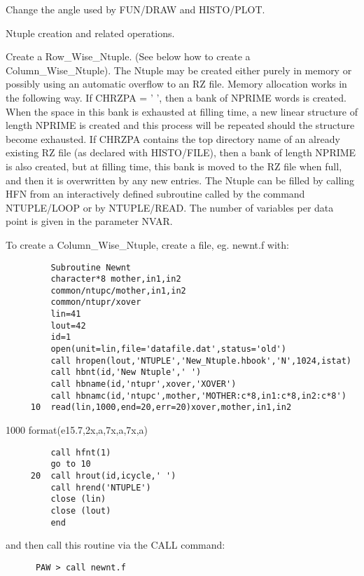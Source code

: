    \par
Change the angle used by FUN/DRAW and HISTO/PLOT.  

\ENDCMD
{}
\ifMENUtext
   \par
Ntuple creation and related operations.  


\fi


\BEGARG
{}
\ENDARG

   \par
Create a Row\_Wise\_Ntuple. (See below how to create a 
   Column\_Wise\_Ntuple).  The Ntuple may be created either purely in memory 
   or possibly using an automatic overflow to an RZ file.  Memory allocation 
   works in the following way.  If CHRZPA = '  ', then a bank of NPRIME words 
   is created. When the space in this bank is exhausted at filling time, a new 
   linear structure of length NPRIME is created and this process will be 
   repeated should the structure become exhausted.  If CHRZPA contains the top 
   directory name of an already existing RZ file (as declared with 
   HISTO/FILE), then a bank of length NPRIME is also created, but at filling 
   time, this bank is moved to the RZ file when full, and then it is 
   overwritten by any new entries.  The Ntuple can be filled by calling HFN 
   from an interactively defined subroutine called by the command NTUPLE/LOOP 
   or by NTUPLE/READ.  The number of variables per data point is given in the 
   parameter NVAR.  

   \par
To create a Column\_Wise\_Ntuple, create a file, eg. newnt.f  with:  
\begin{verbatim}
         Subroutine Newnt
         character*8 mother,in1,in2
         common/ntupc/mother,in1,in2
         common/ntupr/xover
         lin=41
         lout=42
         id=1
         open(unit=lin,file='datafile.dat',status='old')
         call hropen(lout,'NTUPLE','New_Ntuple.hbook','N',1024,istat)
         call hbnt(id,'New Ntuple',' ')
         call hbname(id,'ntupr',xover,'XOVER')
         call hbnamc(id,'ntupc',mother,'MOTHER:c*8,in1:c*8,in2:c*8')
     10  read(lin,1000,end=20,err=20)xover,mother,in1,in2
\end{verbatim}
   \par
1000  format(e15.7,2x,a,7x,a,7x,a) 
\begin{verbatim}
         call hfnt(1)
         go to 10
     20  call hrout(id,icycle,' ')
         call hrend('NTUPLE')
         close (lin)
         close (lout)
         end
\end{verbatim}
   \par
and then call this routine via the CALL command:  
\begin{verbatim}
      PAW > call newnt.f
\end{verbatim}

